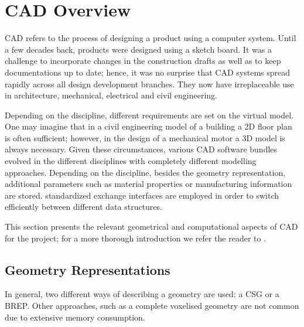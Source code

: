 \section{CAD Overview}
\label{sec:CADbackg}
\Acf{CAD} refers to the process of designing a product using a computer system. Until a few decades back, products were designed using a sketch board. It was a challenge to incorporate changes in the construction drafts as well as to keep documentations up to date; hence, it was no surprise that \ac{CAD} systems spread rapidly across all design development branches. They now have irreplaceable use in architecture, mechanical, electrical and civil engineering.

Depending on the discipline, different requirements are set on the virtual model. One may imagine that in a civil engineering model of a building a 2D floor plan is often sufficient; however, in the design of a mechanical motor a 3D model is always necessary. Given these circumstances, various \ac{CAD} software bundles evolved in the different disciplines with completely different modelling approaches. Depending on the discipline, besides the geometry representation, additional parameters such as material properties or manufacturing information are stored. standardized exchange interfaces are employed in order to switch efficiently between different data structures. 

This section presents the relevant geometrical and computational aspects of \ac{CAD} for the project; for a more thorough introduction we refer the reader to \cite{sarcarCAD}.

\subsection{Geometry Representations}
In general, two different ways of describing a geometry are used: a \acf{CSG} or a \acf{BREP}. Other approaches, such as a complete voxelised geometry are not common due to extensive memory consumption.
